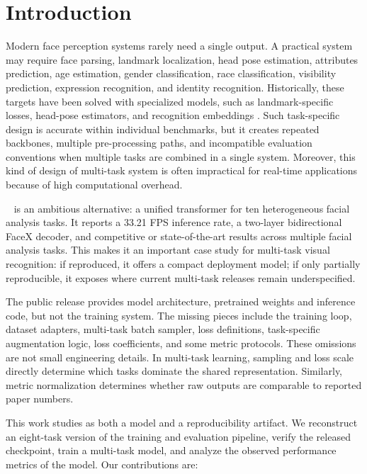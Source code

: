 \section{Introduction}

Modern face perception systems rarely need a single output. A practical system may require face parsing, landmark localization, head pose estimation, attributes prediction, age estimation, gender classification, race classification, visibility prediction, expression recognition, and identity recognition. Historically, these targets have been solved with specialized models, such as landmark-specific losses, head-pose estimators, and recognition embeddings \citep{wing2018,star2023,tokenhpe2023,arcface2019,partialfc2021}. Such task-specific design is accurate within individual benchmarks, but it creates repeated backbones, multiple pre-processing paths, and incompatible evaluation conventions when multiple tasks are combined in a single system. Moreover, this kind of design of multi-task system is often impractical for real-time applications because of high computational overhead.

\method~\citep{facexformer2025} is an ambitious alternative: a unified transformer for ten heterogeneous facial analysis tasks. It reports a 33.21 FPS inference rate, a two-layer bidirectional FaceX decoder, and competitive or state-of-the-art results across multiple facial analysis tasks. This makes it an important case study for multi-task visual recognition: if reproduced, it offers a compact deployment model; if only partially reproducible, it exposes where current multi-task releases remain underspecified.

The public \method release provides model architecture, pretrained weights and inference code, but not the training system. The missing pieces include the training loop, dataset adapters, multi-task batch sampler, loss definitions, task-specific augmentation logic, loss coefficients, and some metric protocols. These omissions are not small engineering details. In multi-task learning, sampling and loss scale directly determine which tasks dominate the shared representation. Similarly, metric normalization determines whether raw outputs are comparable to reported paper numbers.

This work studies \method as both a model and a reproducibility artifact. We reconstruct an eight-task version of the training and evaluation pipeline, verify the released checkpoint, train a multi-task model, and analyze the observed performance metrics of the model. Our contributions are:

